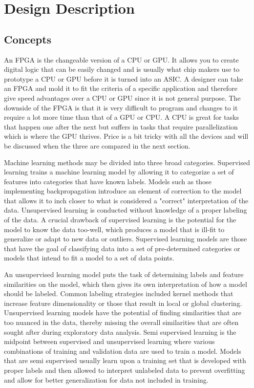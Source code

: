 \documentclass[12pt,titlepage]{article}
\begin{document}
\section{Design Description}
\subsection{Concepts}
An FPGA is the changeable version of a CPU or GPU. It allows you to create digital logic that can be easily changed and is usually what chip makers
use to prototype a CPU or GPU before it is turned into an ASIC. A designer can take an FPGA and mold it to fit the criteria of a specific application
and therefore give speed advantages over a CPU or GPU since it is not general purpose. The downside of the FPGA is that it is very difficult to program
and changes to it require a lot more time than that of a GPU or CPU. A CPU is great for tasks that happen one after the next but suffers in tasks that
require parallelization which is where the GPU thrives. Price is a bit tricky with all the devices and will be discussed when the three are compared in
the next section.

Machine learning methods may be divided into three broad categories. Supervised learning trains a machine learning model by allowing it to categorize
a set of features into categories that have known labels. Models such as those implementing backpropagation introduce an element of correction to the
model that allows it to inch closer to what is considered a "correct" interpretation of the data. Unsupervised learning is conducted without knowledge
of a proper labeling of the data. A crucial drawback of supervised learning is the potential for the model to know the data too-well, which produces a
model that is ill-fit to generalize or adapt to new data or outliers. Supervised learning models are those that have the goal of classifying data into
a set of pre-determined categories or models that intend to fit a model to a set of data points. 

An unsupervised learning model puts the task of determining labels and feature similarities on the model, which then gives its own interpretation of how
a model should be labeled. Common labeling strategies included kernel methods that increase feature dimensionality or those that result in local or
global clustering. Unsupervised learning models have the potential of finding similarities that are too nuanced in the data, thereby missing the overall
similarities that are often sought after during exploratory data analysis.  Semi supervised learning is the midpoint between supervised and unsupervised
learning where various combinations of training and validation data are used to train a model. Models that are semi supervised usually learn upon a
training set that is developed with proper labels and then allowed to interpret unlabeled data to prevent overfitting and allow for better generalization
for data not included in training. 
\end{document}
